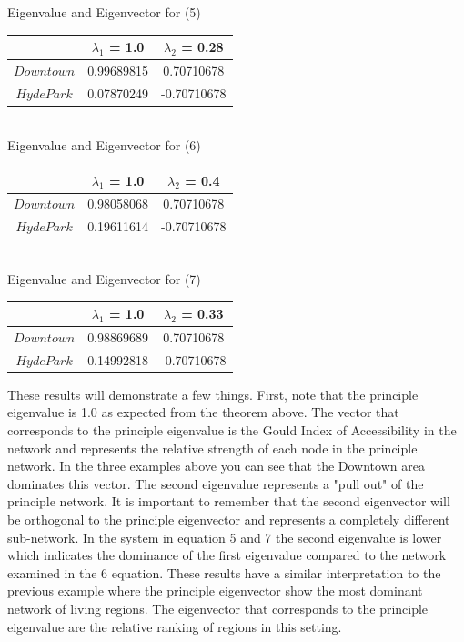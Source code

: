 \documentclass{article}
\theoremstyle{definition}
\theoremstyle{remark}
\begin{document}
\begin{center}
Eigenvalue and Eigenvector for (5) \\
\begin{tabular}{||c | c c ||} 
 \hline
 & $\lambda_1$ = 1.0 & $\lambda_2$ = 0.28\\[0.5ex] 
 \hline\hline
 $Downtown$ & 0.99689815 & 0.70710678\\
 $Hyde Park$ & 0.07870249 & -0.70710678  \\ 
 \hline
 \end{tabular} \\ 
 
Eigenvalue and Eigenvector for (6) \\
\begin{tabular}{||c | c c ||} 
 \hline
 & $\lambda_1$ = 1.0 & $\lambda_2$ = 0.4\\[0.5ex] 
 \hline\hline
 $Downtown$ & 0.98058068 & 0.70710678 \\
 $Hyde Park$ & 0.19611614 & -0.70710678  \\ 
 \hline
 \end{tabular} \\ 
 
Eigenvalue and Eigenvector for (7) \\
\begin{tabular}{||c | c c ||} 
 \hline
 & $\lambda_1$ = 1.0 & $\lambda_2$ = 0.33\\[0.5ex] 
 \hline\hline
 $Downtown$ & 0.98869689 & 0.70710678 \\
 $Hyde Park$ & 0.14992818 & -0.70710678  \\ 
 \hline
 \end{tabular}
 \end{center}

These results will demonstrate a few things.  First, note that the principle eigenvalue is 1.0 as expected from the theorem above.  The vector that corresponds to the principle eigenvalue is the Gould Index of Accessibility in the network and represents the relative strength of each node in the principle network.  In the three examples above you can see that the Downtown area dominates this vector.  The second eigenvalue represents a "pull out" of the principle network.  It is important to remember that the second eigenvector will be orthogonal to the principle eigenvector and represents a completely different sub-network.  In the system in equation 5 and 7 the second eigenvalue is lower which indicates the dominance of the first eigenvalue compared to the network examined in the 6 equation.  These results have a similar interpretation to the previous example where the principle eigenvector show the most dominant network of living regions.  The eigenvector that corresponds to the principle eigenvalue are the relative ranking of regions in this setting.  \\
\end{document}
